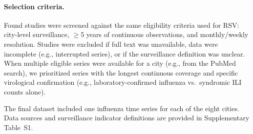 \paragraph{Selection criteria.}
Found studies were screened against the same eligibility criteria used for RSV: city-level surveillance, $\geq$5 years of continuous observations, and monthly/weekly resolution. Studies were excluded if full text was unavailable, data were incomplete (e.g., interrupted series), or if the surveillance definition was unclear. When multiple eligible series were available for a city (e.g., from the PubMed search), we prioritized series with the longest continuous coverage and specific virological confirmation (e.g., laboratory-confirmed influenza vs.\ syndromic ILI counts alone).

The final dataset included one influenza time series for each of the eight cities. Data sources and surveillance indicator definitions are provided in Supplementary Table~S1.

